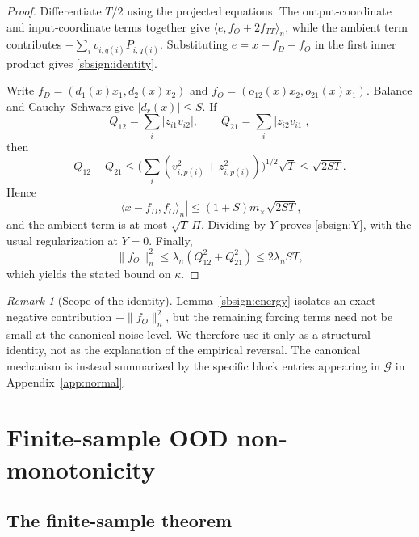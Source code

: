 \documentclass[10pt]{article}
\theoremstyle{remark}\newtheorem{remark}[theorem]{Remark}
\begin{document}
\begin{proof}
Differentiate \(T/2\) using the projected equations.  The output-coordinate
and input-coordinate terms together give
\(\langle e,f_O+2f_{TT}\rangle_n\), while the ambient term contributes
\(-\sum_i v_{i,q(i)}P_{i,q(i)}\).  Substituting
\(e=x-f_D-f_O\) in the first inner product gives
\eqref{sbsign:identity}.

Write
\(f_D=(d_1(x)x_1,d_2(x)x_2)\) and
\(f_O=(o_{12}(x)x_2,o_{21}(x)x_1)\).
Balance and Cauchy--Schwarz give \(|d_r(x)|\le S\).  If
\[
 Q_{12}=\sum_i|z_{i1}v_{i2}|,\qquad
 Q_{21}=\sum_i|z_{i2}v_{i1}|,
\]
then
\[
 Q_{12}+Q_{21}
 \le
 \Big(\sum_i(v_{i,p(i)}^2+z_{i,p(i)}^2)\Big)^{1/2}\sqrt T
 \le\sqrt{2ST}.
\]
Hence
\[
 |\langle x-f_D,f_O\rangle_n|
 \le(1+S)m_\times\sqrt{2ST},
\]
and the ambient term is at most \(\sqrt T\,\Pi\).
Dividing by \(Y\) proves \eqref{sbsign:Y}, with the usual regularization
at \(Y=0\).
Finally,
\[
 \|f_O\|_n^2
 \le \lambda_n(Q_{12}^2+Q_{21}^2)
 \le2\lambda_nST,
\]
which yields the stated bound on \(\kappa\).
\end{proof}

\begin{remark}[Scope of the identity]
Lemma~\ref{sbsign:energy} isolates an exact negative contribution
\(-\|f_O\|_n^2\), but the remaining forcing terms need not be small at the
canonical noise level.  We therefore use it only as a structural identity,
not as the explanation of the empirical reversal.  The canonical mechanism
is instead summarized by the specific block entries appearing in
\(\mathcal G\) in Appendix~\ref{app:normal}.
\end{remark}


\section{Finite-sample OOD non-monotonicity}\label{app:finite}

\subsection{The finite-sample theorem}
\end{document}
